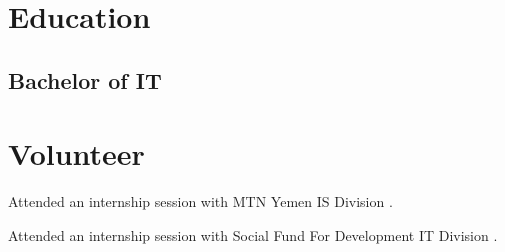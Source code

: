 \documentclass[letterpaper]{deedy-resume} %
\begin{document}
\begin{minipage}[t]{0.33\textwidth}
\sectionspace %



\section{Education} 

\subsection{Bachelor of IT}

\sectionspace %




\sectionspace %









\section{Volunteer} 
\sectionspace %
\begin{tightitemize}
\item Attended an internship session with MTN Yemen IS Division .
\item  Attended an internship session with Social Fund For Development IT Division .


\end{tightitemize}
\end{minipage}
\end{document}

